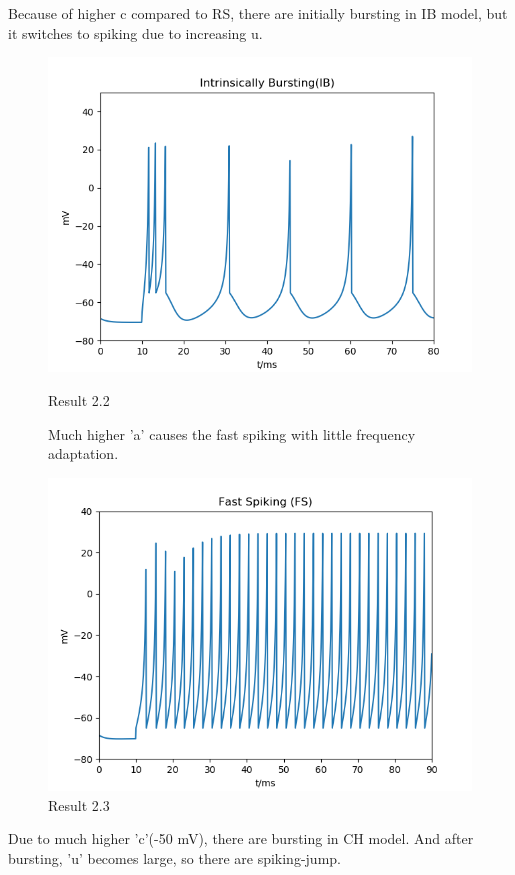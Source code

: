 \documentclass[12pt]{article}
\begin{document}
Because of higher c compared to RS, there are initially bursting in IB model, but it switches to spiking due to increasing u.
 \begin{figure}[H]
  \centering
    \includegraphics[width=.8\textwidth]{h2_p2_IB.png} %
           \caption{Result 2.2}
           
Much higher 'a' causes the fast spiking with little frequency adaptation.

      \includegraphics[width=.8\textwidth]{h2_p2_FS.png} %
       \caption{Result 2.3}
  \label{img} %
\end{figure}

Due to much higher 'c'(-50 mV), there are bursting in CH model. And after bursting, 'u' becomes large, so there are spiking-jump.
\end{document}
